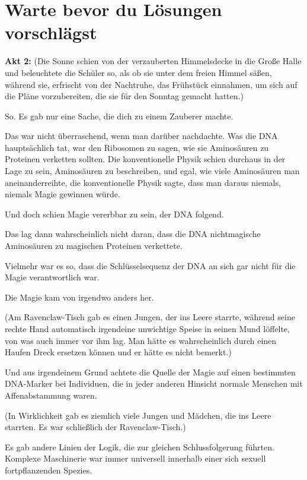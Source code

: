 \chapter{Warte bevor du Lösungen vorschlägst}

\textbf{Akt 2:}
(Die Sonne schien von der verzauberten Himmelsdecke in die Große Halle und
beleuchtete die Schüler so, als ob sie unter dem freien Himmel säßen, während
sie, erfrischt von der Nachtruhe, das Frühstück einnahmen, um sich auf die Pläne
vorzubereiten, die sie für den Sonntag gemacht hatten.)

So. Es gab nur eine Sache, die dich zu einem Zauberer machte.

Das war nicht überraschend, wenn man darüber nachdachte. Was die DNA
hauptsächlich tat, war den Ribosomen zu sagen, wie sie Aminosäuren zu Proteinen
verketten sollten. Die konventionelle Physik schien durchaus in der Lage zu
sein, Aminosäuren zu beschreiben, und egal, wie viele Aminosäuren man
aneinanderreihte, die konventionelle Physik sagte, dass man daraus niemals,
niemals Magie gewinnen würde.

Und doch schien Magie vererbbar zu sein, der DNA folgend.

Das lag dann wahrscheinlich nicht daran, dass die DNA nichtmagische Aminosäuren
zu magischen Proteinen verkettete.

Vielmehr war es so, dass die Schlüsselsequenz der DNA an sich gar nicht für die
Magie verantwortlich war.

Die Magie kam von irgendwo anders her.

(Am Ravenclaw-Tisch gab es einen Jungen, der ins Leere starrte, während seine
rechte Hand automatisch irgendeine unwichtige Speise in seinen Mund löffelte,
von was auch immer vor ihm lag. Man hätte es wahrscheinlich durch einen Haufen
Dreck ersetzen können und er hätte es nicht bemerkt.)

Und aus irgendeinem Grund achtete die Quelle der Magie auf einen bestimmten
DNA-Marker bei Individuen, die in jeder anderen Hinsicht normale Menschen mit
Affenabstammung waren.

(In Wirklichkeit gab es ziemlich viele Jungen und Mädchen, die ins Leere
starrten. Es war schließlich der Ravenclaw-Tisch.)

Es gab andere Linien der Logik, die zur gleichen Schlussfolgerung führten.
Komplexe Maschinerie war immer universell innerhalb einer sich sexuell
fortpflanzenden Spezies.

